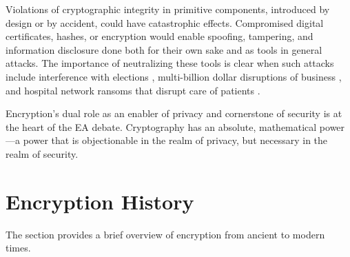 
Violations of cryptographic integrity in primitive components, introduced by design or by accident, could have
catastrophic effects. Compromised digital certificates, hashes, or encryption would enable spoofing, tampering, and
information disclosure done both for their own sake and as tools in general attacks. The importance of neutralizing
these tools is clear when such attacks include interference with elections \cite{mueller_2018}, multi-billion dollar
disruptions of business \cite{greenberg_2018_notpetya}, and hospital network ransoms that disrupt care of patients
\cite{goodin_ransomware_2019}.


Encryption's dual role as an enabler of privacy and cornerstone of security is at the heart of the EA debate.
Cryptography has an absolute, mathematical power---a power that is objectionable in the realm of privacy, but necessary
in the realm of security.


\section{Encryption History}
\label{sec-crypto-history}

The section provides a brief overview of encryption from ancient to modern times.

